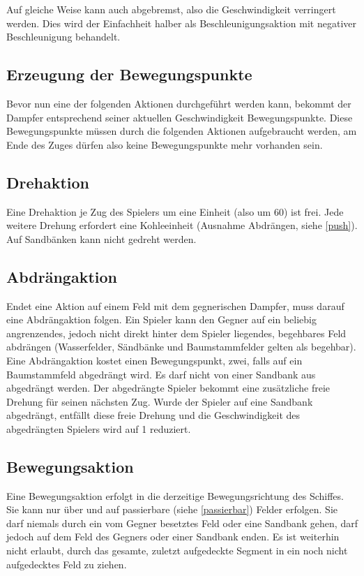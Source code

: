 \documentclass[12pt,a4paper, ngerman, oneside]{scrartcl}
\begin{document}
Auf gleiche Weise kann auch abgebremst, also die Geschwindigkeit verringert
werden. Dies wird der Einfachheit halber als Beschleunigungsaktion mit negativer
Beschleunigung behandelt.

\subsection{Erzeugung der Bewegungspunkte}

Bevor nun eine der folgenden Aktionen durchgeführt werden kann, bekommt der
Dampfer entsprechend seiner aktuellen Geschwindigkeit Bewegungspunkte. Diese
Bewegungspunkte müssen durch die folgenden Aktionen aufgebraucht werden, am Ende
des Zuges dürfen also keine Bewegungspunkte mehr vorhanden sein.

\subsection{\label{turn}Drehaktion}

Eine Drehaktion je Zug des Spielers um eine Einheit (also um 60\degree) ist
frei. Jede weitere Drehung erfordert eine Kohleeinheit (Ausnahme Abdrängen,
siehe \ref{push}). Auf Sandbänken kann nicht gedreht werden.


\subsection{\label{push}Abdrängaktion}

Endet eine Aktion auf einem Feld mit dem gegnerischen Dampfer, muss darauf eine
Abdrängaktion folgen. Ein Spieler kann den Gegner auf ein beliebig angrenzendes,
jedoch nicht direkt hinter dem Spieler liegendes, begehbares Feld abdrängen
(\label{passierbar}Wasserfelder, Sändbänke und Baumstammfelder gelten als
begehbar). Eine Abdrängaktion kostet einen Bewegungspunkt, zwei, falls auf ein
Baumstammfeld abgedrängt wird. Es darf nicht von einer Sandbank aus abgedrängt
werden. Der abgedrängte Spieler bekommt eine zusätzliche freie Drehung für
seinen nächsten Zug. Wurde der Spieler auf eine Sandbank abgedrängt, entfällt
diese freie Drehung und die Geschwindigkeit des abgedrängten Spielers wird auf 1
reduziert.

\subsection{\label{step}Bewegungsaktion}

Eine Bewegungsaktion erfolgt in die derzeitige Bewegungsrichtung des Schiffes.
Sie kann nur über und auf passierbare (siehe \ref{passierbar}) Felder erfolgen.
Sie darf niemals durch ein vom Gegner besetztes Feld oder eine Sandbank gehen,
darf jedoch auf dem Feld des Gegners oder einer Sandbank enden. Es ist weiterhin
nicht erlaubt, durch das gesamte, zuletzt aufgedeckte Segment in ein noch nicht
aufgedecktes Feld zu ziehen.
\end{document}
